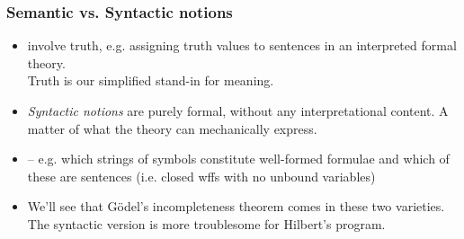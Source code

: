 \begin{frame}
\frametitle{Semantic vs. Syntactic notions}

\begin{itemize}[<+->]

\item {} involve truth, e.g. assigning truth values to sentences in an interpreted formal theory. \\ Truth is our simplified stand-in for \textcolor{OGlyallpink}{meaning}.

\item \emph{Syntactic notions} are purely formal, without any interpretational content. A matter of what the theory can mechanically express. 
\item[] -- e.g. which strings of symbols constitute well-formed formulae and which of these are sentences (i.e. closed wffs with no unbound variables)

\item We'll see that G\"odel's incompleteness theorem comes in these two varieties. The syntactic version is more troublesome for Hilbert's program.

\end{itemize}
\end{frame}


